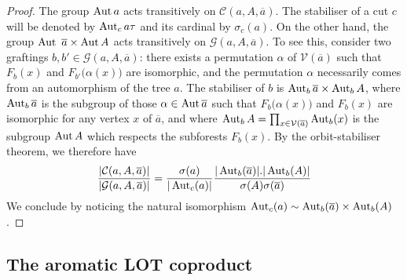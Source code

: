 \documentclass[a4paper,11pt]{article}
\newcommand{\mop}[1]{\mathop{\hbox {\rm #1}}\nolimits}
\begin{document}
\begin{proof}
The group $\mop{Aut} a$ acts transitively on $\mathcal C(a, A, \overline{a})$. The stabiliser of a cut $c$ will be denoted by $\mop{Aut}_{c} a \tau$ and its cardinal by $\sigma_c(a)$. On the other hand, the group $\mop{Aut }\overline{a}\times \mop{Aut} A$ acts transitively on $\mathcal G(a, A, \overline{a})$. To see this, consider two graftings $b, b'\in \mathcal G(a, A, \overline{a})$: there exists a permutation $\alpha$ of $\mathcal V(\overline{a})$ such that $F_{b}(x)$ and $F_{b'}\big(\alpha(x)\big)$ are isomorphic, and the permutation $\alpha$ necessarily comes from an automorphism of the tree $a$. The stabiliser of $b$ is $\mop{Aut}_b \overline{a}\times \mop{Aut}_b A$, where $\mop{Aut}_b\overline{a}$ is the subgroup of those $\alpha\in \mop{Aut}\overline{a}$ such that $F_b\big(\alpha(x)\big)$ and $F_b(x)$ are isomorphic for any vertex $x$ of $\overline{a}$, and where $\mop{Aut}_b A=\prod_{x\in \mathcal {V}(\overline{a})}\mop{Aut}_b(x)$ is the subgroup $\mop{Aut} A$ which respects the subforests $F_b(x)$. By the orbit-stabiliser theorem, we therefore have
\[\frac{\vert \mathcal C(a, A, \overline{a})\vert }{\vert \mathcal G(a, A, \overline{a})\vert}=\frac{\sigma(a)}{\vert\mop{Aut}_c(a)\vert}\frac{\vert\mop{Aut}_b (\overline{a})\vert.\vert \mop{Aut}_b (A)\vert }{\sigma(A)\sigma(\overline{a})}\]
We conclude by noticing the natural isomorphism $\mop{Aut}_c(a) \sim \mop{Aut}_b (\overline{a})\times \mop{Aut}_b (A)$.
\end{proof}













\subsection{The aromatic LOT coproduct}\label{explicit formula}
\end{document}
